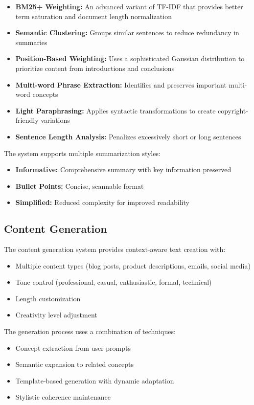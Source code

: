 \documentclass[12pt,a4paper]{article}
\begin{document}
\begin{itemize}
    \item \textbf{BM25+ Weighting:} An advanced variant of TF-IDF that provides better term saturation and document length normalization
    \item \textbf{Semantic Clustering:} Groups similar sentences to reduce redundancy in summaries
    \item \textbf{Position-Based Weighting:} Uses a sophisticated Gaussian distribution to prioritize content from introductions and conclusions
    \item \textbf{Multi-word Phrase Extraction:} Identifies and preserves important multi-word concepts
    \item \textbf{Light Paraphrasing:} Applies syntactic transformations to create copyright-friendly variations
    \item \textbf{Sentence Length Analysis:} Penalizes excessively short or long sentences
\end{itemize}

The system supports multiple summarization styles:
\begin{itemize}
    \item \textbf{Informative:} Comprehensive summary with key information preserved
    \item \textbf{Bullet Points:} Concise, scannable format
    \item \textbf{Simplified:} Reduced complexity for improved readability
\end{itemize}

\subsection{Content Generation}

The content generation system provides context-aware text creation with:

\begin{itemize}
    \item Multiple content types (blog posts, product descriptions, emails, social media)
    \item Tone control (professional, casual, enthusiastic, formal, technical)
    \item Length customization
    \item Creativity level adjustment
\end{itemize}

The generation process uses a combination of techniques:
\begin{itemize}
    \item Concept extraction from user prompts
    \item Semantic expansion to related concepts
    \item Template-based generation with dynamic adaptation
    \item Stylistic coherence maintenance
\end{itemize}
\end{document}
